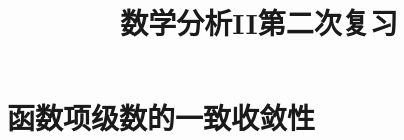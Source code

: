 \usepackage{boldline}
\everymath{\displaystyle}



\title[数分II\\
第二次复习]{\texorpdfstring{\Huge \bfseries 数学分析II第二次复习}{数学分析II第二次复习}} %
\date{}





\begin{frame}

\titlepage %

\end{frame}




\section{函数项级数的一致收敛性}

